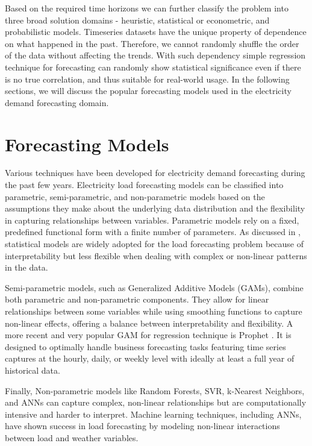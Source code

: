 \documentclass[mstat,12pt]{unswthesis}
\begin{document}
Based on the required time horizons we can further classify the problem
into three broad solution domains - heuristic, statistical or
econometric, and probabilistic models. Timeseries datasets have the
unique property of dependence on what happened in the past. Therefore,
we cannot randomly shuffle the order of the data without affecting the
trends. With such dependency simple regression technique for forecasting
can randomly show statistical significance even if there is no true
correlation, and thus suitable for real-world usage. In the following
sections, we will discuss the popular forecasting models used in the
electricity demand forecasting domain.

\section{Forecasting Models}\label{forecasting-models}

Various techniques have been developed for electricity demand
forecasting during the past few years. Electricity load forecasting
models can be classified into parametric, semi-parametric, and
non-parametric models based on the assumptions they make about the
underlying data distribution and the flexibility in capturing
relationships between variables. Parametric models rely on a fixed,
predefined functional form with a finite number of parameters. As
discussed in \cite{Fan2012}, statistical models are widely adopted for
the load forecasting problem because of interpretability but less
flexible when dealing with complex or non-linear patterns in the data.

Semi-parametric models, such as Generalized Additive Models (GAMs),
combine both parametric and non-parametric components. They allow for
linear relationships between some variables while using smoothing
functions to capture non-linear effects, offering a balance between
interpretability and flexibility. A more recent and very popular GAM for
regression technique is Prophet \cite{taylor2017facebook}. It is
designed to optimally handle business forecasting tasks featuring time
series captures at the hourly, daily, or weekly level with ideally at
least a full year of historical data.

Finally, Non-parametric models like Random Forests, SVR, k-Nearest
Neighbors, and ANNs can capture complex, non-linear relationships but
are computationally intensive and harder to interpret. Machine learning
techniques, including ANNs, have shown success in load forecasting by
modeling non-linear interactions between load and weather variables.
\end{document}
